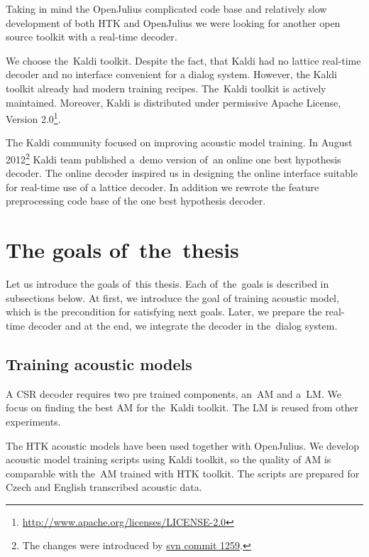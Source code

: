 Taking in mind the OpenJulius complicated code base and relatively slow
development of both \ac{HTK} and OpenJulius we were looking 
for another open source toolkit with a real-time decoder.

We choose the~Kaldi toolkit. Despite the fact,  that Kaldi had no lattice real-time decoder
and no interface convenient for a dialog system.
However, the Kaldi toolkit already had modern training recipes.
The~Kaldi toolkit is actively maintained. Moreover, Kaldi is distributed 
under permissive Apache License, Version 2.0\footnote{\url{http://www.apache.org/licenses/LICENSE-2.0}}.

The Kaldi community focused on improving acoustic model training. 
In August 2012\footnote{The changes were introduced by \href{https://sourceforge.net/p/kaldi/code/1259/}{svn commit 1259}.}
Kaldi team published a~demo version of~an online one best hypothesis decoder.
The online decoder inspired us in designing 
the online interface suitable for real-time use of a lattice decoder.
In addition we rewrote the feature preprocessing code base of the one best hypothesis decoder.

\section{The goals of~the~thesis} 
\label{sec:goals}
Let us introduce the goals of~this thesis. Each of~the~goals is described in subsections below.
At first, we introduce the goal of training acoustic model, which is the precondition for satisfying next goals.
Later, we prepare the real-time decoder and at the end, we integrate the decoder in the~dialog system. 

\subsection{Training acoustic models} 
\label{sub:training_kaldi_acoustic_models}
A \acl{CSR} decoder requires two pre trained components, an~\acl{AM} and 
a~\acl{LM}. We focus on finding the best \acl{AM} for the~Kaldi toolkit. 
The \acl{LM} is reused from other experiments.

The \ac{HTK} acoustic models have been used together with OpenJulius. 
We develop acoustic model training scripts using Kaldi toolkit,
so the quality of \ac{AM} is comparable with the~\ac{AM} trained with \ac{HTK} toolkit. 
The scripts are prepared for Czech and English transcribed acoustic data.

 

